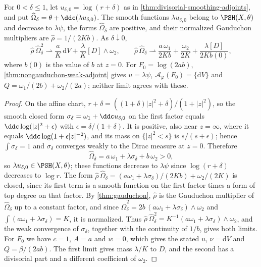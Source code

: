 \begin{proposition}\label{prop:nongauduchon-pole-filling}
For $0<\delta\leq1$, let $u_{\delta,0}=\log(r+\delta)$ as in \cref{thm:divisorial-smoothing-adjoints}, and put $\widehat\Omega_\delta=\theta+\ddc(\lambda u_{\delta,0})$. The smooth functions $\lambda u_{\delta,0}$ belong to $\PSH(X,\theta)$ and decrease to $\lambda\psi$, the forms $\widehat\Omega_\delta$ are positive, and their normalized Gauduchon multipliers are $\widehat\rho=1/(2Kb)$. As $\delta\downarrow0$,
\[
 \widehat\rho\,\widehat\Omega_\delta^2\rightharpoonup\frac aK\,\mathrm dV+\frac\lambda K[D]\wedge\omega_2,
 \qquad
 \widehat\rho\,\widehat\Omega_\delta\rightharpoonup\frac{a\,\omega_1}{2Kb}+\frac{\omega_2}{2K}+\frac{\lambda[D]}{2Kb(0)},
\]
where $b(0)$ is the value of $b$ at $z=0$. For $F_0=\log(2ab)$, \cref{thm:nongauduchon-weak-adjoint} gives $u=\lambda\psi$, $\mathcal A_\varphi(F_0)=\{\mathrm dV\}$ and $Q=\omega_1/(2b)+\omega_2/(2a)$; neither limit agrees with these.
\end{proposition}
\begin{proof}
On the affine chart, $r+\delta=((1+\delta)|z|^2+\delta)/(1+|z|^2)$, so the smooth closed form $\sigma_\delta=\omega_1+\ddc u_{\delta,0}$ on the first factor equals $\ddc\log(|z|^2+\epsilon)$ with $\epsilon=\delta/(1+\delta)$. It is positive, also near $z=\infty$, where it equals $\ddc\log(1+\epsilon|z|^{-2})$, and its mass on $\{|z|^2<s\}$ is $s/(s+\epsilon)$; hence $\int\sigma_\delta=1$ and $\sigma_\delta$ converges weakly to the Dirac measure at $z=0$. Therefore
\[
 \widehat\Omega_\delta=a\,\omega_1+\lambda\sigma_\delta+b\,\omega_2>0,
\]
so $\lambda u_{\delta,0}\in\PSH(X,\theta)$; these functions decrease to $\lambda\psi$ since $\log(r+\delta)$ decreases to $\log r$. The form $\widehat\rho\,\widehat\Omega_\delta=(a\omega_1+\lambda\sigma_\delta)/(2Kb)+\omega_2/(2K)$ is closed, since its first term is a smooth function on the first factor times a form of top degree on that factor. By \cref{thm:gauduchon}, $\widehat\rho$ is the Gauduchon multiplier of $\widehat\Omega_\delta$ up to a constant factor, and since $\widehat\Omega_\delta^2=2b\,(a\omega_1+\lambda\sigma_\delta)\wedge\omega_2$ and $\int(a\omega_1+\lambda\sigma_\delta)=K$, it is normalized. Thus $\widehat\rho\,\widehat\Omega_\delta^2=K^{-1}(a\omega_1+\lambda\sigma_\delta)\wedge\omega_2$, and the weak convergence of $\sigma_\delta$, together with the continuity of $1/b$, gives both limits. For $F_0$ we have $c=1$, $A=a$ and $w=0$, which gives the stated $u$, $\nu=\mathrm dV$ and $Q=\beta/(2ab)$. The first limit gives mass $\lambda/K$ to $D$, and the second has a divisorial part and a different coefficient of $\omega_2$.
\end{proof}

